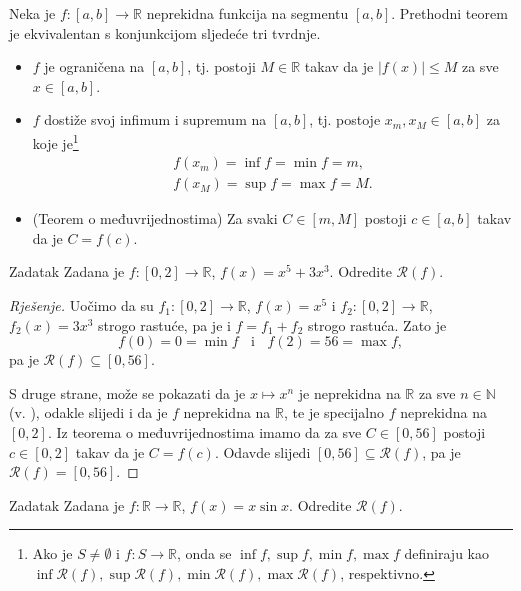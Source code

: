 \begin{remark}
\label{bwremark}
Neka je \(f : [a, b]\to \mathbb{R}\) neprekidna funkcija na segmentu \([a, b]\). Prethodni teorem je ekvivalentan s konjunkcijom sljedeće tri tvrdnje.
\begin{itemize}
\item \(f\) je ograničena na \([a, b]\), tj. postoji \(M\in \mathbb{R}\) takav da je \(|f(x)|\leq M\) za sve \(x\in [a, b]\).
\item \(f\) dostiže svoj infimum i supremum na \([a, b]\), tj. postoje \(x_m, x_M\in [a, b]\) za koje je\footnote{Ako je \(S\neq \emptyset\) i \(f : S\to \mathbb{R}\), onda se \(\inf{f}, \sup{f}, \min{f}, \max{f}\) definiraju kao \(\inf{\mathcal{R}(f)}, \sup{\mathcal{R}(f)}, \min{\mathcal{R}(f)}, \max{\mathcal{R}(f)}\), respektivno.} 
\begin{gather*}
f(x_m)=\inf{f}=\min{f}=m,\\
f(x_M)=\sup{f}=\max{f}=M.
\end{gather*}
\item (Teorem o međuvrijednostima) Za svaki \(C\in [m, M]\) postoji \(c\in [a, b]\) takav da je \(C=f(c)\).
\end{itemize}
\end{remark}
\newpage
\begin{exercise}{Zadatak}
\label{imgcont1}
Zadana je \(f : [0, 2]\to \mathbb{R}\), \(f(x)=x^5+3x^3\). Odredite \(\mathcal{R}(f)\).
\end{exercise}
\begin{proof}[Rješenje]
Uočimo da su \(f_1 : [0, 2]\to \mathbb{R}\), \(f(x)=x^5\) i \(f_2 : [0, 2]\to \mathbb{R}\), \(f_2(x)=3x^3\) strogo rastuće, pa je i \(f=f_1+f_2\) strogo rastuća. Zato je \[f(0)=0=\min{f}\;\;\text{ i }\;\;f(2)=56=\max{f},\]
pa je \(\mathcal{R}(f)\subseteq [0, 56]\).

S druge strane, može se pokazati da je \(x\mapsto x^n\) je neprekidna na \(\mathbb{R}\) za sve \(n\in \mathbb{N}\) (v. \cite{3}), odakle slijedi i da je \(f\) neprekidna na \(\mathbb{R}\), te je specijalno \(f\) neprekidna na \([0, 2]\). Iz teorema o međuvrijednostima imamo da za sve \(C\in [0, 56]\) postoji \(c\in [0, 2]\) takav da je \(C=f(c)\). Odavde slijedi \([0, 56]\subseteq \mathcal{R}(f)\), pa je \(\mathcal{R}(f)=[0, 56]\).
\end{proof}
\begin{exercise}{Zadatak}
Zadana je \(f : \mathbb{R}\to \mathbb{R}\), \(f(x)=x\sin{x}\). Odredite \(\mathcal{R}(f)\).
\end{exercise}
